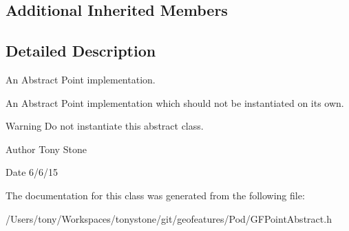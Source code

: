 \subsection*{Additional Inherited Members}


\subsection{Detailed Description}
An Abstract Point implementation. 

An Abstract Point implementation which should not be instantiated on it\textquotesingle{}s own.

\begin{DoxyWarning}{Warning}
Do not instantiate this abstract class.
\end{DoxyWarning}
\begin{DoxyAuthor}{Author}
Tony Stone 
\end{DoxyAuthor}
\begin{DoxyDate}{Date}
6/6/15 
\end{DoxyDate}


The documentation for this class was generated from the following file\+:\begin{DoxyCompactItemize}
\item 
/\+Users/tony/\+Workspaces/tonystone/git/geofeatures/\+Pod/G\+F\+Point\+Abstract.\+h\end{DoxyCompactItemize}
